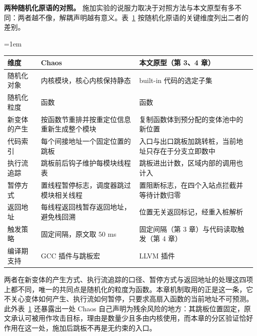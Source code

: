 \textbf{两种随机化原语的对照。} 施加实验的说服力取决于对照方法与本文原型有多不同：两者越不像，解耦声明越有意义。表~\ref{tab:5-5} 按随机化原语的关键维度列出二者的差别。

\begin{table}[!htbp]
    \label{tab:5-5}
    \centering
    \scriptsize
    \setlength{\tabcolsep}{3pt}
    \renewcommand{\arraystretch}{1.25}
    \emergencystretch=1em
    \begin{tabular}{>{\raggedright\arraybackslash}p{}>{\raggedright\arraybackslash}p{}>{\raggedright\arraybackslash}p{}}
        \hline
        维度 & Chaos\citep{chang2024chaos} & 本文原型（第 3、4 章）\\
        \hline
        随机化对象 & 内核模块，核心内核保持静态 & built-in 代码的选定子集\\
        随机化粒度 & 函数 & 函数\\
        新变体的产生 & 按函数节重排并按重定位信息重新生成整个模块 & 复制函数体到预分配的变体池中的新位置\\
        代码索引 & 每个间接地址一个固定位置的跳板 & 入口与出口跳板加跳转桩，当前地址只存在于分支立即数中\\
        执行流追踪 & 跳板前后钩子维护每模块线程表 & 跳板进出计数，区域内部的调用也计入\\
        暂停方式 & 置线程暂停标志，调度器跳过模块相关线程 & 置阻断标志，在四个入站点拦截并等待计数归零\\
        返回地址 & 每线程返回栈暂存返回地址，避免栈回溯 & 位置无关返回标记，经重入桩解析\\
        触发策略 & 固定间隔，原文取 50 ms & 固定间隔（第 3 章）与代码读取触发（第 4 章）\\
        编译期支持 & GCC 插件与跳板宏 & LLVM 插件\\
        \hline
    \end{tabular}
\end{table}

两者在新变体的产生方式、执行流追踪的口径、暂停方式与返回地址的处理这四项上都不同，唯一的共同点是随机化的粒度为函数。本章机制取用的正是这一条，它不关心变体如何产生、执行流如何暂停，只要求高扇入函数的当前地址不可预测。此外表~\ref{tab:5-5} 还暴露出一处 Chaos 自己声明为残余风险的地方：其跳板位置固定，原文承认可被用作攻击目标，理由是数量少且多由内核使用，而本章的分区验证恰好作用在这一处，施加后跳板不再是无约束的入口。

